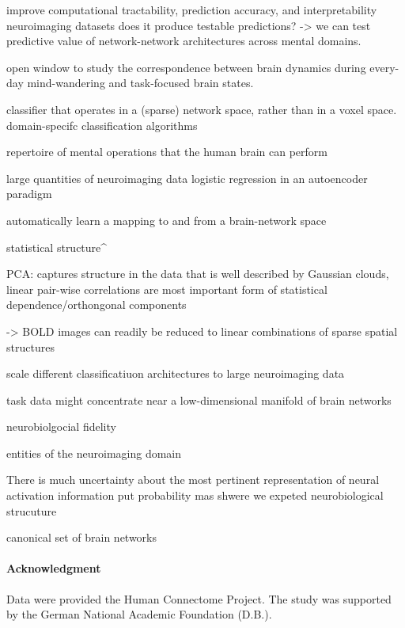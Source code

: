 \documentclass{article} %
\begin{document}
improve computational tractability, prediction accuracy, and interpretability
neuroimaging datasets
does it produce testable predictions?
-> we can test predictive value of network-network architectures across
mental domains.

open window to study the correspondence between brain dynamics during
every-day mind-wandering and task-focused brain states.

classifier that operates in a (sparse) network space, rather than in a voxel space.
domain-specifc classification algorithms

repertoire of mental operations that the human brain can perform

large quantities of neuroimaging data
logistic regression in an autoencoder paradigm

automatically learn a mapping to and from a brain-network space

statistical structure^

PCA:
captures structure in the data that is well described by Gaussian clouds,
linear pair-wise correlations are most important form of statistical
dependence/orthongonal components

-> BOLD images can readily be reduced to linear combinations of
sparse spatial structures

scale different classificatiuon architectures to large neuroimaging data

task data might concentrate near a low-dimensional manifold of brain networks

neurobiolgocial fidelity

entities of the neuroimaging domain

There is much uncertainty about the most pertinent representation
of neural activation information
put probability mas shwere we expeted neurobiological strucuture

canonical set of brain networks

%
\paragraph{Acknowledgment}
{\small
Data were provided the Human Connectome Project. The study was supported
by the German National Academic Foundation (D.B.).
}


\small


\end{document}
